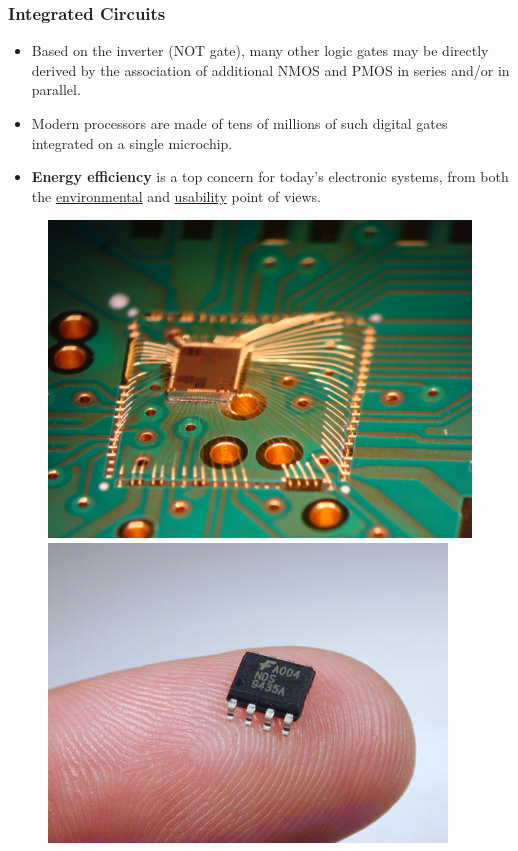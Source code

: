 \documentclass{beamer}
\begin{document}
\begin{frame}
\frametitle{ Integrated Circuits}
\begin{minipage}{.75\textwidth}

\begin{itemize}
\item Based on the inverter (NOT gate),  many other logic gates may be directly derived by the association of additional NMOS and PMOS in series and/or in parallel. 

\item Modern processors are made of tens of millions of such digital gates integrated on a single microchip.

\item {\bf Energy efficiency }is a top concern for today's electronic systems, from both  the \underline{environmental} and  \underline{usability} point of views.  

\end{itemize}
\end{minipage}
\hfill
\begin{minipage}{.2\textwidth}
\begin{figure}
\includegraphics[width=1.3\linewidth]{img/ic3.jpg}
\\
\includegraphics[width=1.3\linewidth]{img/ic2.jpg}


\end{figure}
\end{minipage}
\end{frame}
\end{document}
